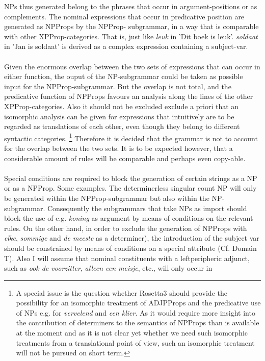 NPs thus generated belong to the phrases 
that occur in argument-positions or as complements. The nominal expressions 
that occur in predicative position are generated as NPProps by the NPProp-
subgrammar, in a way that is 
comparable with 
other XPProp-categories. That is, just like {\em leuk} in 'Dit boek is leuk'.
{\em soldaat} in 'Jan is soldaat' is derived as a complex expression containing
a subject-var.\\ \\
Given the enormous overlap between the two sets of expressions that
can occur in either function, the ouput of the NP-subgrammar could be 
taken as  possible input for the NPProp-subgrammar. But the overlap
is not total, and the predicative function of NPProps favours an analysis
along the lines of the other XPProp-categories. Also it should not be excluded
exclude a priori that an isomorphic analysis can be given for 
expressions 
that intuitively are to be regarded as translations of each other, even 
though they belong to different syntactic categories.
\footnote{A special issue is 
the question whether Rosetta3 should provide the possibility
for an isomorphic treatment of ADJPProps and the predicative use of NPs 
e.g. for  {\em vervelend} and {\em een klier}.
As it would require more
insight into the contribution of determiners to the semantics of NPProps than
is available at the moment and as 
it is not clear yet whether we need such isomorphic treatments from a 
translational point of view, such an isomorphic treatment will not be pursued
on short term.}
 Therefore 
it is decided that the grammar is not to account for the overlap
between the two sets.  It is to be expected however, that 
a considerable amount of rules will
be comparable and perhaps even copy-able. 
\\ \\
Special conditions are required to block the generation of certain strings as a
NP or as a NPProp. Some examples. The determinerless singular count NP will
only be generated within the NPProp-subgrammar but also within the
NP-subgrammar. Consequently the subgrammars that take NPs as import should
block the use of e.g. {\em koning} as argument by means of conditions on the
relevant rules. On the other hand, in order to exclude the generation of
NPProps with {\em elke}, {\em sommige} and {\em de meeste} as a determiner),
the introduction of  the subject var should be constrained by means of
conditions on a special attribute (Cf. Domain T). Also I will assume that
nominal constituents with a leftperipheric adjunct, such as {\em ook de
voorzitter}, {\em alleen een meisje}, etc., will only occur in
